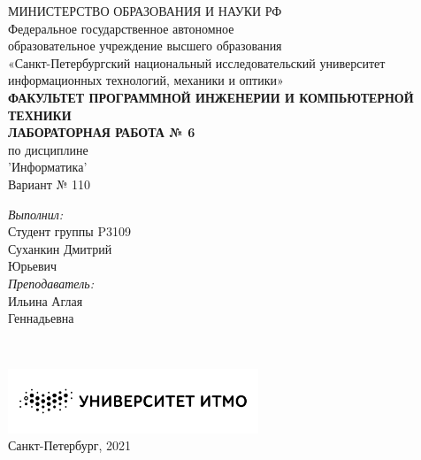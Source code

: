 {\centering
МИНИСТЕРСТВО ОБРАЗОВАНИЯ И НАУКИ РФ \\
\vspace{0.6cm}
Федеральное государственное автономное \\
образовательное учреждение высшего образования \\
«Санкт-Петербургский национальный исследовательский университет \\
 информационных технологий, механики и оптики» \\
\vspace{0.6cm}
\footnotesize{\textbf{ФАКУЛЬТЕТ ПРОГРАММНОЙ ИНЖЕНЕРИИ И КОМПЬЮТЕРНОЙ ТЕХНИКИ}} \\
\vspace{3.2cm}
\Large{\textbf{ЛАБОРАТОРНАЯ РАБОТА № 6}} \\
\large{по дисциплине} \\
\Large{'Информатика'} \\
\vspace{1cm}
\Large{Вариант № 110} \\
\vspace{9cm}
\begin{minipage}{\linewidth}
\raggedleft
\normalsize
\textsl{Выполнил:} \\
Студент группы P3109 \\
Суханкин Дмитрий \\ Юрьевич \\
\textsl{Преподаватель:} \\
Ильина Аглая \\ Геннадьевна
\end{minipage} \\
\vspace{2cm}
\begin{minipage}{\linewidth}
\centering
\includegraphics[width=7.5cm]{images/logo.png} \\
\normalsize{Санкт-Петербург, 2021} \\
\end{minipage} \\}